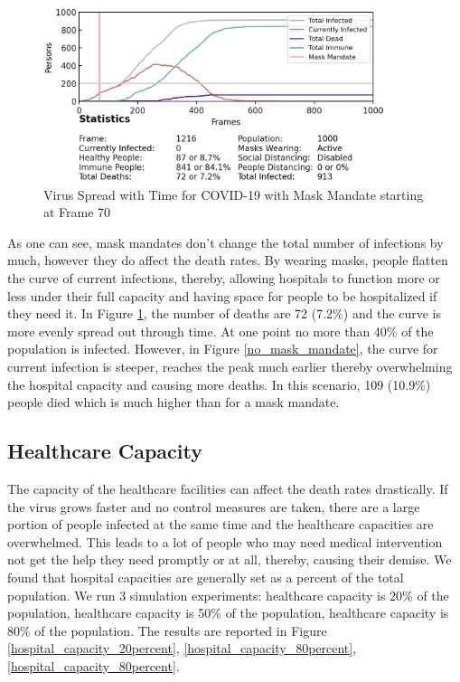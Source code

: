 \documentclass[11pt]{article}
\begin{document}
\begin{figure}[H]
    \centering
    \includegraphics[width=10cm]{figures/mask_mandate.png}
    \caption{Virus Spread with Time for COVID-19 with Mask Mandate starting at Frame 70}
    \label{mask_mandate}
\end{figure}

As one can see, mask mandates don't change the total number of infections by much, however they do affect the death rates. By wearing masks, people flatten the curve of current infections, thereby, allowing hospitals to function more or less under their full capacity and having space for people to be hospitalized if they need it. In Figure \ref{mask_mandate}, the number of deaths are 72 (7.2\%) and the curve is more evenly spread out through time. At one point no more than 40\% of the population is infected. However, in Figure \ref{no_mask_mandate}, the curve for current infection is steeper, reaches the peak much earlier thereby overwhelming the hospital capacity and causing more deaths. In this scenario, 109 (10.9\%) people died which is much higher than for a mask mandate. 

\subsection{Healthcare Capacity}
The capacity of the healthcare facilities can affect the death rates drastically. If the virus grows faster and no control measures are taken, there are a large portion of people infected at the same time and the healthcare capacities are overwhelmed. This leads to a lot of people who may need medical intervention not get the help they need promptly or at all, thereby, causing their demise\cite{healthcare_capacity}. We found that hospital capacities are generally set as a percent of the total population. We run 3 simulation experiments: healthcare capacity is 20\% of the population, healthcare capacity is 50\% of the population, healthcare capacity is 80\% of the population. The results are reported in Figure \ref{hospital_capacity_20percent}, \ref{hospital_capacity_80percent}, \ref{hospital_capacity_80percent}.
\end{document}
